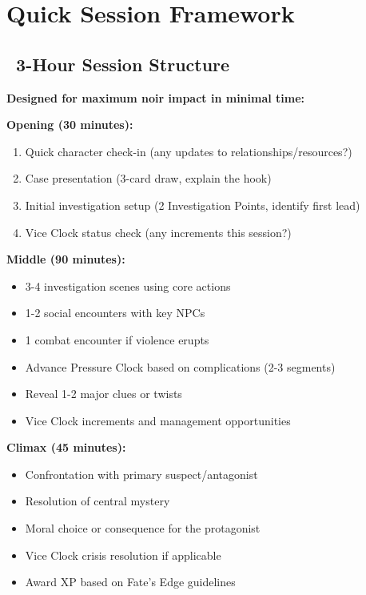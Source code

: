 \documentclass[11pt]{article}
\begin{document}
\newpage

\section{Quick Session Framework}

\subsection*{\faClock\ 3-Hour Session Structure}

\textbf{Designed for maximum noir impact in minimal time:}

\textbf{Opening (30 minutes):}
\begin{enumerate}
    \item Quick character check-in (any updates to relationships/resources?)
    \item Case presentation (3-card draw, explain the hook)
    \item Initial investigation setup (2 Investigation Points, identify first lead)
    \item Vice Clock status check (any increments this session?)
\end{enumerate}

\textbf{Middle (90 minutes):}
\begin{itemize}
    \item 3-4 investigation scenes using core actions
    \item 1-2 social encounters with key NPCs
    \item 1 combat encounter if violence erupts
    \item Advance Pressure Clock based on complications (2-3 segments)
    \item Reveal 1-2 major clues or twists
    \item Vice Clock increments and management opportunities
\end{itemize}

\textbf{Climax (45 minutes):}
\begin{itemize}
    \item Confrontation with primary suspect/antagonist
    \item Resolution of central mystery
    \item Moral choice or consequence for the protagonist
    \item Vice Clock crisis resolution if applicable
    \item Award XP based on Fate's Edge guidelines
\end{itemize}
\end{document}
